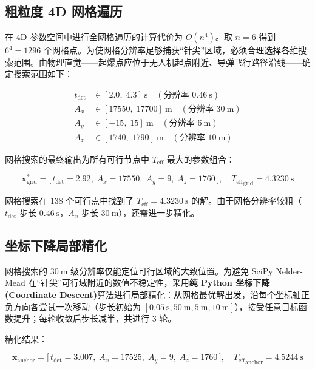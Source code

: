 \documentclass[12pt,a4paper]{ctexart}
\newcommand{\tdet}{t_{\text{det}}}
\newcommand{\Teff}{T_{\text{eff}}}
\begin{document}
\subsection{粗粒度 4D 网格遍历}
\label{sec:anchor-grid}

在 4D 参数空间中进行全网格遍历的计算代价为 $O(n^4)$。取 $n = 6$ 得到 $6^4 = 1296$ 个网格点。为使网格分辨率足够捕获``针尖''区域，必须合理选择各维搜索范围。由物理直觉——起爆点应位于无人机起点附近、导弹飞行路径沿线——确定搜索范围如下：

\begin{equation}
\begin{aligned}
\tdet &\in [2.0,\; 4.3]\ \mathrm{s} \quad (\text{分辨率 } 0.46\ \mathrm{s}) \\
A_x &\in [17550,\; 17700]\ \mathrm{m} \quad (\text{分辨率 } 30\ \mathrm{m}) \\
A_y &\in [-15,\; 15]\ \mathrm{m} \quad (\text{分辨率 } 6\ \mathrm{m}) \\
A_z &\in [1740,\; 1790]\ \mathrm{m} \quad (\text{分辨率 } 10\ \mathrm{m})
\end{aligned}
\end{equation}

网格搜索的最终输出为所有可行节点中 $\Teff$ 最大的参数组合：

\begin{equation}
\boxed{\mathbf{x}_{\text{grid}}^* = \big[\,\tdet = 2.92,\; A_x = 17550,\; A_y = 9,\; A_z = 1760\,\big], \quad {\Teff}_{\text{grid}} = 4.3230\ \mathrm{s}}
\label{eq:grid-result}
\end{equation}

网格搜索在 138 个可行点中找到了 $\Teff = 4.3230\ \mathrm{s}$ 的解。由于网格分辨率较粗（$\tdet$ 步长 $0.46\ \mathrm{s}$，$A_x$ 步长 $30\ \mathrm{m}$），还需进一步精化。

\subsection{坐标下降局部精化}

网格搜索的 $30\ \mathrm{m}$ 级分辨率仅能定位可行区域的大致位置。为避免 SciPy Nelder-Mead 在``针尖''可行域附近的数值不稳定性，采用\textbf{纯 Python 坐标下降 (Coordinate Descent)}算法进行局部精化：从网格最优解出发，沿每个坐标轴正负方向各尝试一次移动（步长初始为 $[0.05\ \mathrm{s}, 50\ \mathrm{m}, 5\ \mathrm{m}, 10\ \mathrm{m}]$），接受任意目标函数提升；每轮收敛后步长减半，共进行 3 轮。

精化结果：

\begin{equation}
\boxed{\mathbf{x}_{\text{anchor}} = \big[\,\tdet = 3.007,\; A_x = 17525,\; A_y = 9,\; A_z = 1760\,\big], \quad {\Teff}_{\text{anchor}} = 4.5244\ \mathrm{s}}
\label{eq:anchor-result}
\end{equation}
\end{document}
